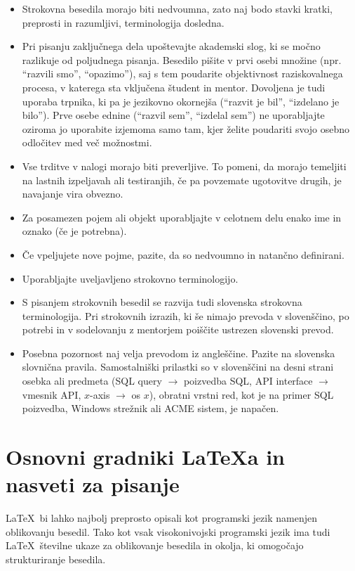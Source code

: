 \documentclass[9pt]{style/friteza}
\begin{document}
\begin{itemize}
    \item Strokovna besedila morajo biti nedvoumna, zato naj bodo stavki kratki, preprosti in razumljivi, terminologija dosledna. 
    \item Pri pisanju zaključnega dela upoštevajte akademski slog, ki se močno razlikuje od poljudnega pisanja. Besedilo pišite v prvi osebi množine (npr. \enquote{razvili smo}, \enquote{opazimo}), saj s tem poudarite objektivnost raziskovalnega procesa, v katerega sta vključena študent in mentor. Dovoljena je tudi uporaba trpnika, ki pa je jezikovno okornejša (\enquote{razvit je bil}, \enquote{izdelano je bilo}). Prve osebe ednine (\enquote{razvil sem}, \enquote{izdelal sem}) ne uporabljajte oziroma jo uporabite izjemoma samo tam, kjer želite poudariti svojo osebno odločitev med več možnostmi. 
    \item Vse trditve v nalogi morajo biti preverljive. To pomeni, da morajo temeljiti na lastnih izpeljavah ali testiranjih, če pa povzemate ugotovitve drugih, je navajanje vira obvezno.
    \item Za posamezen pojem ali objekt uporabljajte v celotnem delu enako ime in oznako (če je potrebna). 
    \item Če vpeljujete nove pojme, pazite, da so nedvoumno in natančno definirani. 
    \item Uporabljajte uveljavljeno strokovno terminologijo. 
    \item S pisanjem strokovnih besedil se razvija tudi slovenska strokovna terminologija. Pri strokovnih izrazih, ki še nimajo prevoda v slovenščino, po potrebi in v sodelovanju z mentorjem poiščite ustrezen slovenski prevod. 
    \item Posebna pozornost naj velja prevodom iz angleščine. Pazite na slovenska slovnična pravila. Samostalniški prilastki so v slovenščini na desni strani osebka ali predmeta (SQL query $\rightarrow$ poizvedba SQL, API interface $\rightarrow$ vmesnik API, $x$-axis $\rightarrow$ os $x$), obratni vrstni red, kot je na primer SQL poizvedba, Windows strežnik ali ACME sistem, je napačen.
\end{itemize}


\section{Osnovni gradniki \LaTeX{a} in nasveti za pisanje}
\label{sec:osnove}

\LaTeX\ bi lahko najbolj preprosto opisali kot programski jezik namenjen oblikovanju besedil.
Tako kot vsak visokonivojski programski jezik ima tudi \LaTeX\  številne ukaze za oblikovanje  besedila in okolja, ki omogočajo strukturiranje besedila.
\end{document}
